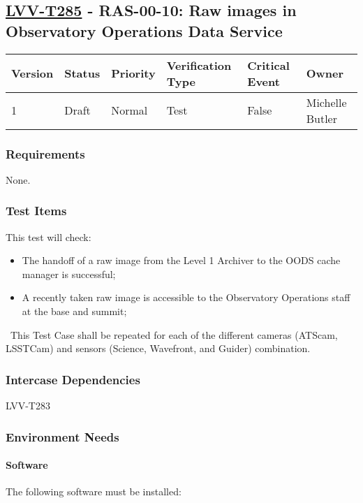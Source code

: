 \subsection{\href{https://jira.lsstcorp.org/secure/Tests.jspa\#/testCase/LVV-T285}{LVV-T285}
    - RAS-00-10: Raw images in Observatory Operations Data Service}\label{lvv-t285}

\begin{longtable}[]{llllll}
\toprule
Version & Status & Priority & Verification Type & Critical Event & Owner
\\\midrule
1 & Draft & Normal &
Test & False & Michelle Butler
\\\bottomrule
\end{longtable}

\subsubsection{Requirements}
    None.

\subsubsection{Test Items}
This test will check:

\begin{itemize}
\tightlist
\item
  The handoff of a raw image from the Level 1 Archiver to the OODS cache
  manager is successful;
\item
  A recently taken raw image is accessible to the Observatory Operations
  staff at the base and summit;
\end{itemize}

~This Test Case shall be repeated for each of the different cameras
(ATScam, LSSTCam) and sensors (Science, Wavefront, and Guider)
combination.



\subsubsection{Intercase Dependencies}
LVV-T283


\subsubsection{Environment Needs}

\paragraph{Software}
The following software must be installed:\\
~\\

